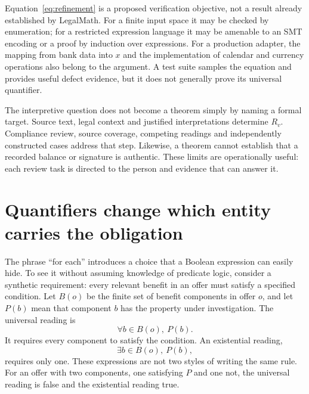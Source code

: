 \documentclass[12pt,a4paper,oneside,openany]{book}
\begin{document}
Equation~\eqref{eq:refinement} is a proposed verification objective, not a result
already established by LegalMath. For a finite input space it may be checked by
enumeration; for a restricted expression language it may be amenable to an SMT
encoding or a proof by induction over expressions. For a production adapter,
the mapping from bank data into $x$ and the implementation of calendar and
currency operations also belong to the argument. A test suite samples the
equation and provides useful defect evidence, but it does not generally prove its
universal quantifier.

The interpretive question does not become a theorem simply by naming a formal
target. Source text, legal context and justified interpretations determine
$R_v$. Compliance review, source coverage, competing readings and independently
constructed cases address that step. Likewise, a theorem cannot establish that
a recorded balance or signature is authentic. These limits are operationally
useful: each review task is directed to the person and evidence that can answer it.

\section{Quantifiers change which entity carries the obligation}
\label{merge:M03:01}


The phrase ``for each'' introduces a choice that a Boolean expression can easily
hide. To see it without assuming knowledge of predicate logic, consider a
synthetic requirement: every relevant benefit in an offer must satisfy a specified
condition. Let $B(o)$ be the finite set of benefit components in offer $o$, and
let $P(b)$ mean that component $b$ has the property under investigation. The
universal reading is
\begin{equation}
 \forall b\in B(o),\ P(b).
 \label{eq:universal-benefit}
\end{equation}
It requires every component to satisfy the condition. An existential reading,
\begin{equation}
 \exists b\in B(o),\ P(b),
 \label{eq:existential-benefit}
\end{equation}
requires only one. These expressions are not two styles of writing the same rule.
For an offer with two components, one satisfying $P$ and one not, the universal
reading is false and the existential reading true.
\end{document}
